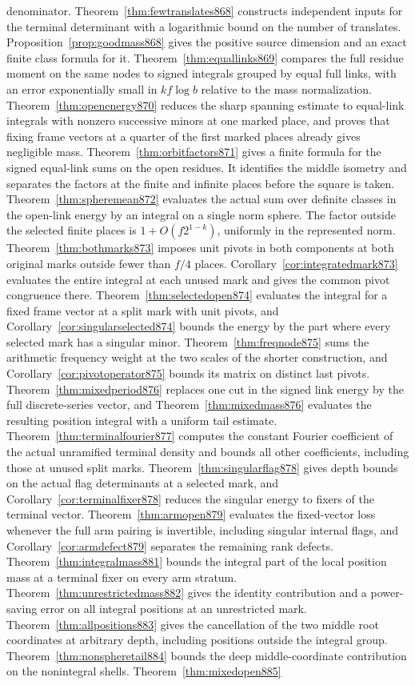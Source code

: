 \documentclass[a4paper,11pt]{article}
\theoremstyle{definition}
\theoremstyle{remark}
\numberwithin{equation}{section}
\begin{document}
denominator. Theorem~\ref{thm:fewtranslates868} constructs independent inputs for the terminal determinant with a logarithmic bound on the number of translates. Proposition~\ref{prop:goodmass868} gives the positive source dimension and an exact finite class formula for it. Theorem~\ref{thm:equallinks869} compares the full residue moment on the same nodes to signed integrals grouped by equal full links, with an error exponentially small in \(kf\log b\) relative to the mass normalization. Theorem~\ref{thm:openenergy870} reduces the sharp spanning estimate to equal-link integrals with nonzero successive minors at one marked place, and proves that fixing frame vectors at a quarter of the first marked places already gives negligible mass. Theorem~\ref{thm:orbitfactors871} gives a finite formula for the signed equal-link sums on the open residues. It identifies the middle isometry and separates the factors at the finite and infinite places before the square is taken. Theorem~\ref{thm:spheremean872} evaluates the actual sum over definite classes in the open-link energy by an integral on a single norm sphere. The factor outside the selected finite places is \(1+O(f2^{1-k})\), uniformly in the represented norm. Theorem~\ref{thm:bothmarks873} imposes unit pivots in both components at both original marks outside fewer than \(f/4\) places. Corollary~\ref{cor:integratedmark873} evaluates the entire integral at each unused mark and gives the common pivot congruence there. Theorem~\ref{thm:selectedopen874} evaluates the integral for a fixed frame vector at a split mark with unit pivots, and Corollary~\ref{cor:singularselected874} bounds the energy by the part where every selected mark has a singular minor. Theorem~\ref{thm:freqnode875} sums the arithmetic frequency weight at the two scales of the shorter construction, and Corollary~\ref{cor:pivotoperator875} bounds its matrix on distinct last pivots. Theorem~\ref{thm:mixedperiod876} replaces one cut in the signed link energy by the full discrete-series vector, and Theorem~\ref{thm:mixedmass876} evaluates the resulting position integral with a uniform tail estimate. Theorem~\ref{thm:terminalfourier877} computes the constant Fourier coefficient of the actual unramified terminal density and bounds all other coefficients, including those at unused split marks. Theorem~\ref{thm:singularflag878} gives depth bounds on the actual flag determinants at a selected mark, and Corollary~\ref{cor:terminalfixer878} reduces the singular energy to fixers of the terminal vector. Theorem~\ref{thm:armopen879} evaluates the fixed-vector loss whenever the full arm pairing is invertible, including singular internal flags, and Corollary~\ref{cor:armdefect879} separates the remaining rank defects. Theorem~\ref{thm:integralmass881} bounds the integral part of the local position mass at a terminal fixer on every arm stratum. Theorem~\ref{thm:unrestrictedmass882} gives the identity contribution and a power-saving error on all integral positions at an unrestricted mark. Theorem~\ref{thm:allpositions883} gives the cancellation of the two middle root coordinates at arbitrary depth, including positions outside the integral group. Theorem~\ref{thm:nonspheretail884} bounds the deep middle-coordinate contribution on the nonintegral shells. Theorem~\ref{thm:mixedopen885} 
\end{document}
